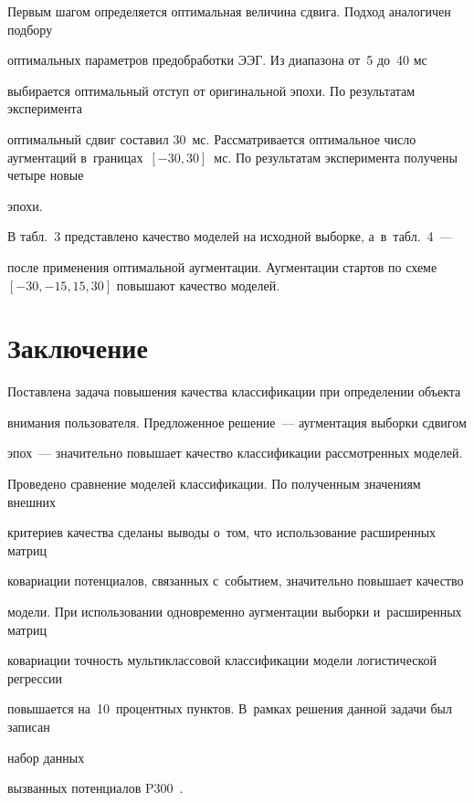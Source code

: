 Первым шагом определяется оптимальная величина сдвига. Подход аналогичен подбору 

оптимальных параметров предобработки ЭЭГ. Из диапазона от~5 до~40 мс 

выбирается оптимальный отступ от оригинальной эпохи. По результатам эксперимента 

оптимальный сдвиг  составил 30~мс. Рассматривается оптимальное число аугментаций в~границах~$[-30, 30]$~мс. По результатам эксперимента получены четыре новые 

эпохи.



В табл.~3 представлено качество моделей на исходной выборке, а~в~табл.~4~--- 

после применения оптимальной аугментации. Аугментации стартов по схеме $[-30, -15, 15, 30]$ повышают качество моделей.



\section{Заключение}



Поставлена задача повышения качества классификации при определении объекта 

внимания пользователя. Предложенное решение~--- аугментация выборки сдвигом 

эпох~--- значительно повышает качество классификации рассмотренных моделей. 

Проведено сравнение моделей классификации.  По полученным значениям внешних 

критериев качества сделаны выводы о~том, что использование расширенных матриц 

ковариации потенциалов, связанных с~событием, значительно повышает качество 

модели. При использовании одновременно аугментации выборки и~расширенных матриц 

ковариации точность мультиклассовой классификации модели логистической регрессии 

повышается на~10~процентных пунктов. В~рамках решения данной задачи был записан 

набор данных  %

{вызванных потенциалов P300}~\cite{goncharenkoP300}.




